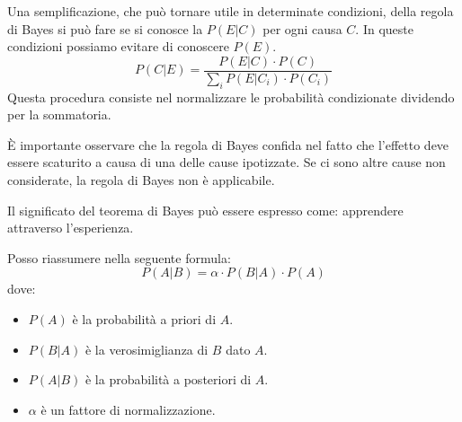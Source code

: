 Una semplificazione, che può tornare utile in determinate condizioni, della
regola di Bayes si può fare se si conosce la $P(E|C)$ per ogni causa $C$. In
queste condizioni possiamo evitare di conoscere $P(E)$.
\begin{equation}
    P(C|E) = \frac{P(E|C) \cdot P(C)}{\sum_{i} P(E|C_i) \cdot P(C_i)}
\end{equation}
Questa procedura consiste nel normalizzare le probabilità condizionate dividendo per
la sommatoria.
\begin{nota}
    È importante osservare che la regola di Bayes confida nel fatto che l'effetto
    deve essere scaturito a causa di una delle cause ipotizzate. Se ci sono altre
    cause non considerate, la regola di Bayes non è applicabile.
\end{nota}
Il significato del teorema di Bayes può essere espresso come: apprendere
attraverso l'esperienza.

Posso riassumere nella seguente formula:
\begin{equation}
    P(A|B) = \alpha \cdot P(B | A) \cdot P(A)
\end{equation}
dove:
\begin{itemize}
    \item $P(A)$ è la probabilità a priori di $A$.
    \item $P(B|A)$ è la verosimiglianza di $B$ dato $A$.
    \item $P(A|B)$ è la probabilità a posteriori di $A$.
    \item $\alpha$ è un fattore di normalizzazione.
\end{itemize}

